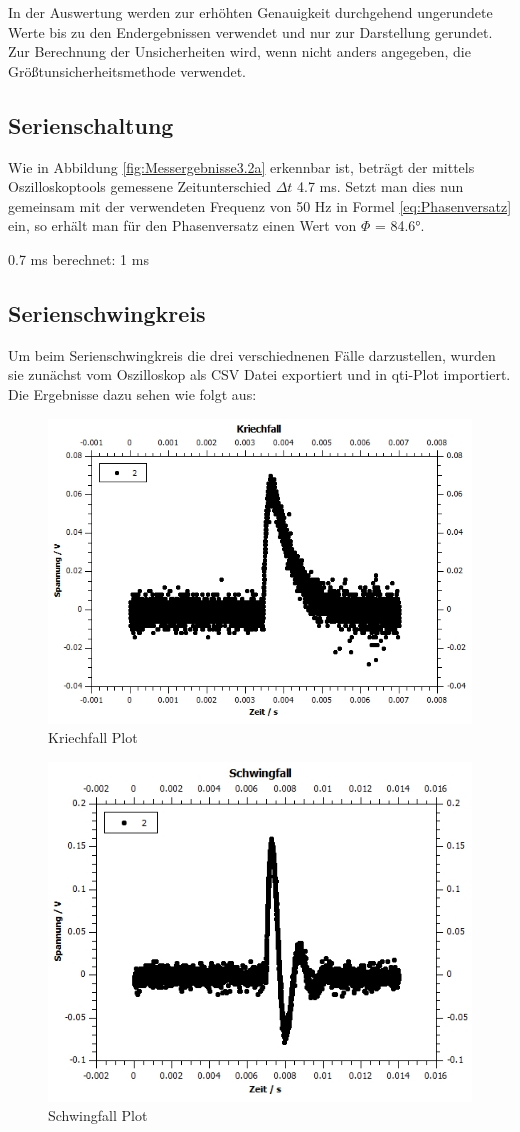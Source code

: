 \documentclass[12pt,a4paper,twoside]{article}
\begin{document}
In der Auswertung werden zur erhöhten Genauigkeit durchgehend ungerundete Werte bis zu den Endergebnissen verwendet und nur zur Darstellung gerundet. \\
Zur Berechnung der Unsicherheiten wird, wenn nicht anders angegeben, die Größtunsicherheitsmethode verwendet.

\subsection{Serienschaltung}

Wie in Abbildung \ref{fig:Messergebnisse3.2a} erkennbar ist, beträgt der mittels Oszilloskoptools gemessene Zeitunterschied $\Delta t$ 4.7 ms. Setzt man dies nun gemeinsam mit der verwendeten Frequenz von 50 Hz in Formel \ref{eq:Phasenversatz} ein, so erhält man für den Phasenversatz einen Wert von $\Phi$ = 84.6°.

0.7 ms 
berechnet: 1 ms


\subsection{Serienschwingkreis}

Um beim Serienschwingkreis die drei verschiednenen Fälle darzustellen, wurden sie zunächst vom Oszilloskop als CSV Datei exportiert und in qti-Plot importiert. Die Ergebnisse dazu sehen wie folgt aus:

\begin{figure}[H]
    \centering
    \includegraphics[width=0.6\linewidth, angle=0]{nudes/KriechfallPlot.jpg}
    \caption{Kriechfall Plot}
    \label{fig:KriechfallPlot}
\end{figure}

\begin{figure}[H]
    \centering
    \includegraphics[width=0.6\linewidth, angle=0]{nudes/SchwingfallPlot.jpg}
    \caption{Schwingfall Plot}
    \label{fig:SchwingfallPlot}
\end{figure}
\end{document}
